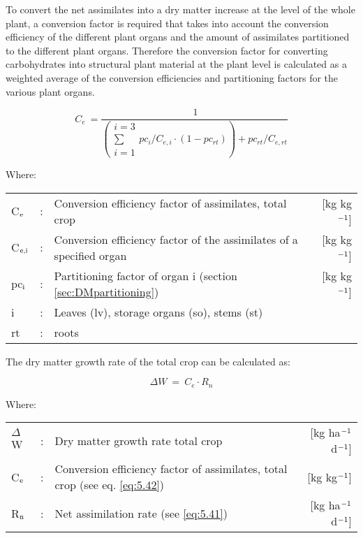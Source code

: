 To convert the net assimilates into a dry matter increase at the level of the whole plant, a  conversion factor is required that takes into account the conversion efficiency of the different plant organs and the amount of assimilates partitioned to the different plant organs. Therefore the conversion factor for converting carbohydrates into structural plant material at the plant level is calculated as a weighted average of the conversion efficiencies and partitioning factors for the various plant organs.

\begin{equation}
\label{eq:5.42}
C _{e} ~={\frac{~1}{
			\left(
			\begin{array}{c}
			{i=3}  \\
			\sum  \\
			{i=1}
			\end{array} {pc_{i}}/{C_{e,i}} \cdot (1-pc_{rt}) 
			\right)
			+ {pc_{rt}}/{C_{e,rt}} 
}}
\end{equation}

Where:\\[5pt]
\begin{tabularx}{\textwidth}{llXr}
	C$_{{\rm e}}$ &:& Conversion efficiency factor of assimilates, total crop  &   
	[kg kg$^{{\rm -1}}$]\\
	C$_{{\rm e,i}}$ &:& Conversion efficiency factor of the assimilates 
	of a specified organ  &      [kg kg$^{{\rm -1}}$]\\
	pc$_{{\rm i}}$ &:& Partitioning factor of organ i (section \ref{sec:DMpartitioning})   &
	[kg kg$^{{\rm -1}}$]\\
	i &:& Leaves (lv), storage organs (so), stems (st)\\
	rt &:& roots\\
\end{tabularx}

The dry matter growth rate of the total crop can be calculated as:

\begin{equation}
\Delta W~=~ C_{e} \cdot R_{n} 
\end{equation}

Where:\\[5pt]
\begin{tabularx}{\textwidth}{llXr}
	$\Delta$W &:& Dry matter growth rate total crop   &
	[kg ha$^{{\rm -1}}$ d$^{{\rm -1}}$]\\
	C$_{{\rm e}}$ &:& Conversion efficiency factor of assimilates,
	total crop (see eq. \ref{eq:5.42})    &    [kg kg$^{{\rm -1}}$] \\
	R$_{{\rm n}}$ &:& Net assimilation rate (see \ref{eq:5.41})   &
	[kg ha$^{{\rm -1}}$ d$^{{\rm -1}}$]\\
\end{tabularx}

